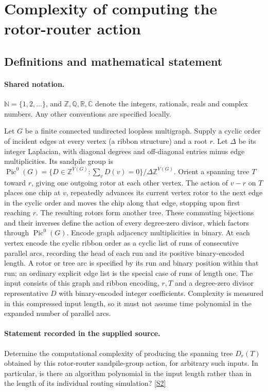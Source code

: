 \documentclass[11pt]{article}
\newcommand{\sref}[2]{\hyperlink{source:#1:#2}{[S#2]}}
\begin{document}
\section{Complexity of computing the rotor-router action}\label{statement}

\subsection{Definitions and mathematical statement}

\paragraph{Shared notation.}$\mathbb N=\{1,2,\ldots\}$, and $\mathbb Z,\mathbb Q,\mathbb R,\mathbb C$ denote the integers, rationals, reals and complex numbers. Any other conventions are specified locally.


Let $G$ be a finite connected undirected loopless multigraph. Supply a cyclic order of incident edges at every vertex (a ribbon structure) and a root $r$. Let $\Delta$ be its integer Laplacian, with diagonal degrees and off-diagonal entries minus edge multiplicities. Its sandpile group is $\operatorname{Pic}^0(G)=\{D\in\mathbb Z^{V(G)}:\sum_v D(v)=0\}/\Delta\mathbb Z^{V(G)}$. Orient a spanning tree $T$ toward $r$, giving one outgoing rotor at each other vertex. The action of $v-r$ on $T$ places one chip at $v$, repeatedly advances its current vertex rotor to the next edge in the cyclic order and moves the chip along that edge, stopping upon first reaching $r$. The resulting rotors form another tree. These commuting bijections and their inverses define the action of every degree-zero divisor, which factors through $\operatorname{Pic}^0(G)$. Encode graph adjacency multiplicities in binary. At each vertex encode the cyclic ribbon order as a cyclic list of runs of consecutive parallel arcs, recording the head of each run and its positive binary-encoded length. A rotor or tree arc is specified by its run and binary position within that run; an ordinary explicit edge list is the special case of runs of length one. The input consists of this graph and ribbon encoding, $r,T$ and a degree-zero divisor representative $D$ with binary-encoded integer coefficients. Complexity is measured in this compressed input length, so it must not assume time polynomial in the expanded number of parallel arcs.
\paragraph{Statement recorded in the supplied source.}
Determine the computational complexity of producing the spanning tree $D_r(T)$ obtained by this rotor-router sandpile-group action, for arbitrary such inputs. In particular, is there an algorithm polynomial in the input length rather than in the length of its individual routing simulation? \sref{statement}{2}
\end{document}
